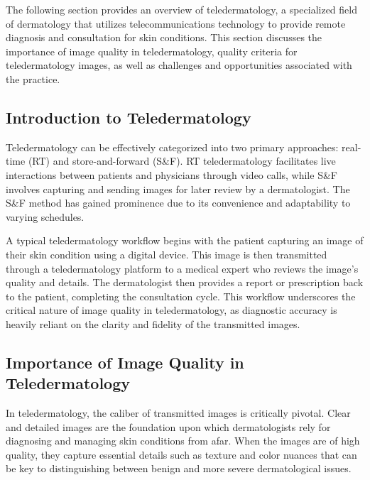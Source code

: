 The following section provides an overview of teledermatology, a specialized field of dermatology that utilizes telecommunications technology to provide remote diagnosis and consultation for skin conditions. This section discusses the importance of image quality in teledermatology, quality criteria for teledermatology images, as well as challenges and opportunities associated with the practice. \par
\vspace{\baselineskip}
\noindent

\subsection{Introduction to Teledermatology}
\label{sub:IntroductionTeledermatology}
Teledermatology can be effectively categorized into two primary approaches: real-time (RT) and store-and-forward (S\&F). RT teledermatology facilitates live interactions between patients and physicians through video calls, while S\&F involves capturing and sending images for later review by a dermatologist. The S\&F method has gained prominence due to its convenience and adaptability to varying schedules.\par
\vspace{\baselineskip}
\noindent
A typical teledermatology workflow begins with the patient capturing an image of their skin condition using a digital device. This image is then transmitted through a teledermatology platform to a medical expert who reviews the image's quality and details. The dermatologist then provides a report or prescription back to the patient, completing the consultation cycle. This workflow underscores the critical nature of image quality in teledermatology, as diagnostic accuracy is heavily reliant on the clarity and fidelity of the transmitted images.\par

\subsection{Importance of Image Quality in Teledermatology}
\label{sub:ImportanceIQA_Teledermatology}
In teledermatology, the caliber of transmitted images is critically pivotal. Clear and detailed images are the foundation upon which dermatologists rely for diagnosing and managing skin conditions from afar. When the images are of high quality, they capture essential details such as texture and color nuances that can be key to distinguishing between benign and more severe dermatological issues.\par
\vspace{\baselineskip}
\noindent

